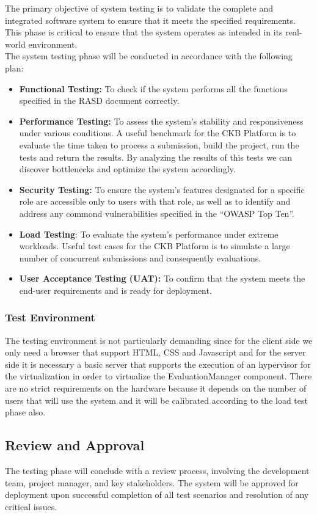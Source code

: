 The primary objective of system testing is to validate the complete and integrated software system to ensure that it meets the specified requirements. This phase is critical to ensure that the system operates as intended in its real-world environment.\\
The system testing phase will be conducted in accordance with the following plan:
\begin{itemize}
    \item \textbf{Functional Testing:} To check if the system performs all the functions specified in the RASD document correctly.
    \item \textbf{Performance Testing:} To assess the system’s stability and responsiveness under various conditions. A useful benchmark for the CKB Platform is to evaluate the time taken to process a submission, build the project, run the tests and return the results. By analyzing the results of this tests we can discover bottlenecks and optimize the system accordingly.
    \item \textbf{Security Testing:} To ensure the system's features designated for a specific role are accessible only to users with that role, as well as to identify and address any commond vulnerabilities specified in the ``OWASP Top Ten''.
    \item \textbf{Load Testing}: To evaluate the system's performance under extreme workloads. Useful test cases for the CKB Platform is to simulate a large number of concurrent submissions and consequently evaluations.
    \item \textbf{User Acceptance Testing (UAT):} To confirm that the system meets the end-user requirements and is ready for deployment.
\end{itemize}

\subsubsection{Test Environment}
The testing environment is not particularly demanding since for the client side we only need a browser that support HTML, CSS and Javascript and for the server side it is necessary a basic server that supports the execution of an hypervisor for the virtualization in order to virtualize the EvaluationManager component. There are no strict requirements on the hardware because it depends on the number of users that will use the system and it will be calibrated according to the load test phase also.
\subsection{Review and Approval}
The testing phase will conclude with a review process, involving the development team, project manager, and key stakeholders. The system will be approved for deployment upon successful completion of all test scenarios and resolution of any critical issues.